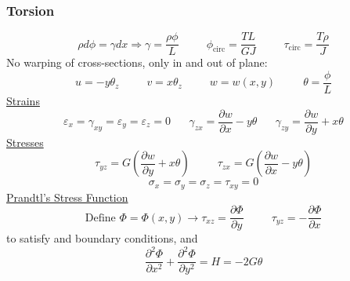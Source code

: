 \documentclass[twocolumn, 12pt]{article}    %
\begin{document}
\subsubsection*{Torsion}
\begin{equation*}
    \rho d\phi = \gamma dx \Longrightarrow \gamma = \frac{\rho \phi}{L} \hspace{30pt} \phi_{\text{circ}} = \frac{TL}{GJ} \hspace{30pt} \tau_{\text{circ}} = \frac{T\rho}{J}
\end{equation*}
No warping of cross-sections, only in and out of plane:
\begin{equation*}
    u = -y \theta_z \hspace{30pt} v = x\theta_z \hspace{30pt} w = w(x,y) \hspace{30pt} \theta = \frac{\phi}{L}
\end{equation*}
\underline{Strains}\\
\begin{equation*}
    \varepsilon_x = \gamma_{xy} = \varepsilon_y = \varepsilon_z = 0 \hspace{20pt} \gamma_{zx} =  \frac{\partial{w}}{\partial{x}} - y\theta \hspace{20pt} \gamma_{zy} =  \frac{\partial{w}}{\partial{y}} + x\theta
\end{equation*}
\underline{Stresses}\\
\begin{equation*}
    \tau_{yz} = G \left(  \frac{\partial{w}}{\partial{y}} +x\theta \right) \hspace{30pt} \tau_{zx} = G \left(  \frac{\partial{w}}{\partial{x}} -y\theta \right)
\end{equation*}
\begin{equation*}
    \sigma_x = \sigma_y = \sigma_z =\tau_{xy} = 0 
\end{equation*}
\underline{Prandtl's Stress Function}\\
\begin{equation*}
    \text{Define }\Phi = \Phi (x,y) \longrightarrow \tau_{xz} =  \frac{\partial{\Phi}}{\partial{y}} \hspace{30pt} \tau_{yz} = - \frac{\partial{\Phi}}{\partial{x}}
\end{equation*}
to satisfy and boundary conditions, and
\begin{equation*}
    \frac{\partial^2 \Phi}{\partial{x^2}} +  \frac{\partial^2 \Phi}{\partial{y^2}} = H = - 2G\theta
\end{equation*}
\end{document}
